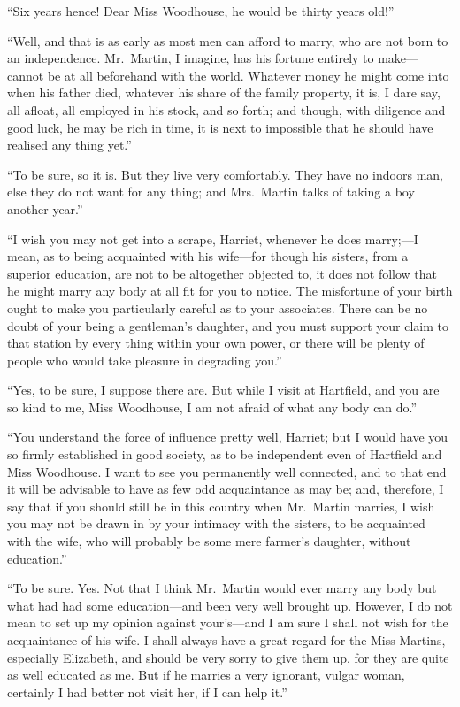 ``Six years hence! Dear Miss Woodhouse, he would be thirty years old!''

``Well, and that is as early as most men can afford to marry,
who are not born to an independence.  Mr.\ Martin, I imagine,
has his fortune entirely to make---cannot be at all beforehand with
the world.  Whatever money he might come into when his father died,
whatever his share of the family property, it is, I dare say,
all afloat, all employed in his stock, and so forth; and though,
with diligence and good luck, he may be rich in time, it is next to
impossible that he should have realised any thing yet.''

``To be sure, so it is.  But they live very comfortably.
They have no indoors man, else they do not want for any thing;
and Mrs.\ Martin talks of taking a boy another year.''

``I wish you may not get into a scrape, Harriet, whenever he does
marry;---I mean, as to being acquainted with his wife---for though
his sisters, from a superior education, are not to be altogether
objected to, it does not follow that he might marry any body at all fit
for you to notice.  The misfortune of your birth ought to make you
particularly careful as to your associates.  There can be no doubt
of your being a gentleman's daughter, and you must support your
claim to that station by every thing within your own power, or there
will be plenty of people who would take pleasure in degrading you.''

``Yes, to be sure, I suppose there are.  But while I visit
at Hartfield, and you are so kind to me, Miss Woodhouse,
I am not afraid of what any body can do.''

``You understand the force of influence pretty well, Harriet; but I
would have you so firmly established in good society, as to be
independent even of Hartfield and Miss Woodhouse.  I want to see you
permanently well connected, and to that end it will be advisable
to have as few odd acquaintance as may be; and, therefore, I say
that if you should still be in this country when Mr.\ Martin marries,
I wish you may not be drawn in by your intimacy with the sisters,
to be acquainted with the wife, who will probably be some mere
farmer's daughter, without education.''

``To be sure.  Yes.  Not that I think Mr.\ Martin would ever marry any body
but what had had some education---and been very well brought up.
However, I do not mean to set up my opinion against your's---and I
am sure I shall not wish for the acquaintance of his wife.  I shall
always have a great regard for the Miss Martins, especially Elizabeth,
and should be very sorry to give them up, for they are quite as well
educated as me.  But if he marries a very ignorant, vulgar woman,
certainly I had better not visit her, if I can help it.''

